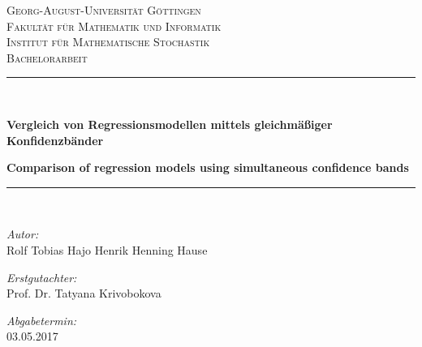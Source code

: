 \documentclass[12pt,a4paper]{article}
\theoremstyle{definition}
\theoremstyle{definition}
\theoremstyle{definition}
\theoremstyle{definition}
\begin{document}
\begin{titlepage}

\begin{center}



\textsc{\LARGE Georg-August-Universität Göttingen}\\
\textsc{Fakultät für Mathematik und Informatik}\\
\textsc{Institut für Mathematische Stochastik}\\[1.5cm]


\textsc{\Large Bachelorarbeit}\\[0.5cm]


\newcommand{\HRule}{\rule{\linewidth}{0.5mm}}
\HRule \\[0.4cm]
\begin{onehalfspace}
{ \LARGE \bfseries  Vergleich von Regressionsmodellen mittels gleichmäßiger Konfidenzbänder  }\\[0.4cm]
\end{onehalfspace}
{ \large \bfseries Comparison of regression models using simultaneous confidence bands}\\[0.4cm]

\HRule \\[1cm]


\begin{minipage}{0.4\textwidth}
\begin{flushleft} \large
\emph{Autor:}\\
Rolf Tobias Hajo Henrik Henning Hause\\
\end{flushleft}
\end{minipage}
\hfill
\begin{minipage}{0.4\textwidth}
\begin{flushright} \large
\emph{Erstgutachter:} \\
Prof. Dr. Tatyana Krivobokova\\
\end{flushright}
\end{minipage}
\vspace{0.3cm}

\begin{minipage}{0.4\textwidth}
\begin{flushleft} \large
\emph{Abgabetermin:}\\
03.05.2017\\


\end{flushleft}
\end{minipage}
\end{center}
\end{titlepage}
\end{document}
